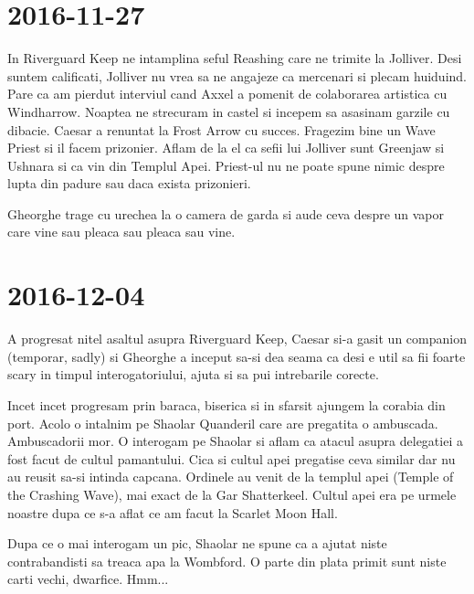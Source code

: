 \documentclass[12pt,oneside]{book}
\begin{document}
\section{2016-11-27}

In Riverguard Keep ne intamplina seful Reashing care ne trimite la Jolliver.
Desi suntem calificati, Jolliver nu vrea sa ne angajeze ca mercenari si plecam 
huiduind. Pare ca am pierdut interviul cand Axxel a pomenit de colaborarea artistica
cu Windharrow.
Noaptea ne strecuram in  castel si incepem sa asasinam garzile cu dibacie. Caesar a
renuntat la Frost Arrow cu succes.
Fragezim bine un Wave Priest si il facem prizonier. Aflam de la el ca sefii lui Jolliver sunt Greenjaw si Ushnara si ca vin din Templul Apei. Priest-ul nu ne poate spune nimic despre lupta din padure sau daca exista prizonieri.

Gheorghe trage cu urechea la o camera de garda si aude ceva despre un vapor care
vine sau pleaca sau pleaca sau vine.

\section{2016-12-04}

A progresat nitel asaltul asupra Riverguard Keep, Caesar si-a gasit un companion (temporar, sadly) si Gheorghe a inceput sa-si dea seama ca desi e util sa fii foarte scary in timpul interogatoriului, ajuta si sa pui intrebarile corecte.

Incet incet progresam prin baraca, biserica si in sfarsit ajungem la corabia din port.
Acolo o intalnim pe Shaolar Quanderil care are pregatita o ambuscada. Ambuscadorii mor. O interogam pe Shaolar si aflam ca atacul asupra delegatiei a fost facut de cultul pamantului. Cica si cultul apei pregatise ceva similar dar nu au reusit sa-si intinda capcana. Ordinele au venit de la templul apei (Temple of the Crashing Wave), mai exact de la Gar Shatterkeel.
Cultul apei era pe urmele noastre dupa ce s-a aflat ce am facut la Scarlet Moon Hall.

Dupa ce o mai interogam un pic, Shaolar  ne spune ca a ajutat niste contrabandisti sa treaca apa la Wombford. O parte din plata primit sunt niste carti vechi, dwarfice.
Hmm...

\newpage
\end{document}
